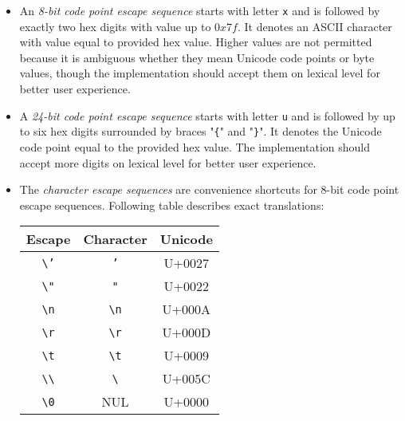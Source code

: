 \begin{itemize}
  \item An \emph{8-bit code point escape sequence} starts with letter \texttt{x} and is followed by exactly two hex digits with value up to \(0x7f\). It denotes an ASCII character with value equal to provided hex value. Higher values are not permitted because it is ambiguous whether they mean Unicode code points or byte values, though the implementation should accept them on lexical level for better user experience.
  \item A \emph{24-bit code point escape sequence} starts with letter \texttt{u} and is followed by up to six hex digits surrounded by braces "\texttt{\{}" and "\texttt{\}}". It denotes the Unicode code point equal to the provided hex value. The implementation should accept more digits on lexical level for better user experience.
  \item The \emph{character escape sequences} are convenience shortcuts for 8-bit code point escape sequences. Following table describes exact translations:

    \begin{center}
    \begin{tabular}{c|c|c}
      Escape & Character & Unicode \\
      \hline
      \texttt{\textbackslash '} & \texttt{'} & U+0027 \\
      \texttt{\textbackslash "} & \texttt{"} & U+0022 \\
      \texttt{\textbackslash n} & \texttt{\textbackslash n} & U+000A \\
      \texttt{\textbackslash r} & \texttt{\textbackslash r} & U+000D \\
      \texttt{\textbackslash t} & \texttt{\textbackslash t} & U+0009 \\
      \texttt{\textbackslash \textbackslash} & \texttt{\textbackslash} & U+005C \\
      \texttt{\textbackslash 0} & NUL & U+0000 \\
    \end{tabular}
    \end{center}
\end{itemize}
